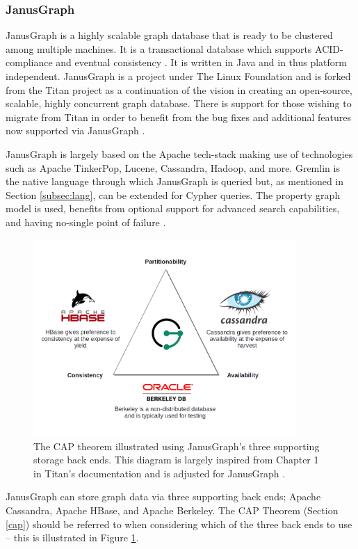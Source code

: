 \subsubsection{JanusGraph}

JanusGraph is a highly scalable graph database that is ready to be clustered among multiple machines. It is a transactional database which supports ACID-compliance and eventual consistency \cite{janusgraph-main}. It is written in Java and in thus platform independent. JanusGraph is a project under The Linux Foundation and is forked from the Titan project as a continuation of the vision in creating an open-source, scalable, highly concurrent graph database. There is support for those wishing to migrate from Titan in order to benefit from the bug fixes and additional features now supported via JanusGraph \cite{janusgraph-titan}.

JanusGraph is largely based on the Apache tech-stack making use of technologies such as Apache TinkerPop, Lucene, Cassandra, Hadoop, and more. Gremlin is the native language through which JanusGraph is queried but, as mentioned in Section \ref{subsec:lang}, can be extended for Cypher queries. The property graph model is used, benefits from optional support for advanced search capabilities, and having no-single point of failure \cite{janusgraph-docs}.

\begin{figure}[h!]
    \centering
    \includegraphics[width=10cm]{img/CAP-JanusGraph.png}
    \caption{The CAP theorem illustrated using JanusGraph's three supporting storage back ends. This diagram is largely inspired from Chapter 1 in Titan's documentation and is adjusted for JanusGraph \cite{titan-cap}.}
    \label{fig:janusgraph-cap}
\end{figure}

JanusGraph can store graph data via three supporting back ends; Apache Cassandra, Apache HBase, and Apache Berkeley. The CAP Theorem (Section \ref{cap}) should be referred to when considering which of the three back ends to use -- this is illustrated in Figure \ref{fig:janusgraph-cap}.

